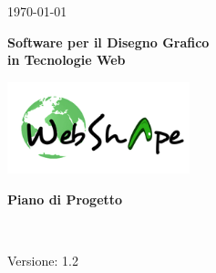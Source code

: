 \usepackage{multirow}
\title{\TITOLODOC}
\author{Dal Bosco Davide}



\renewcommand{\insertversion}{1.2} %
\renewcommand{\TITOLODOC}{Piano di Progetto} %
\renewcommand{\glosspath}{.\glossario} %

\begin{titlepage}
\begin{center}
	\begin{Large}	\today \end{Large}
\end{center}

\vspace{20pt}

\begin{center}
	\begin{Huge}
				\textbf{\ajax}
	\end{Huge}
\end{center}			

\begin{center}
	\begin{large}
				\textbf{Software per il Disegno Grafico\\ in Tecnologie Web}
	\end{large}
\end{center}			

\vspace{20pt}

\begin{center}
\includegraphics[width=150pt]{../logo/logo}
\end{center}

\vspace{170pt}
\begin{center} %
	\begin{Huge}
				\textbf{\TITOLODOC}
	\end{Huge}
			\\
\end{center}
\vspace{210pt}
\begin{center}
Versione: \insertversion
\end{center}
\end{titlepage}

